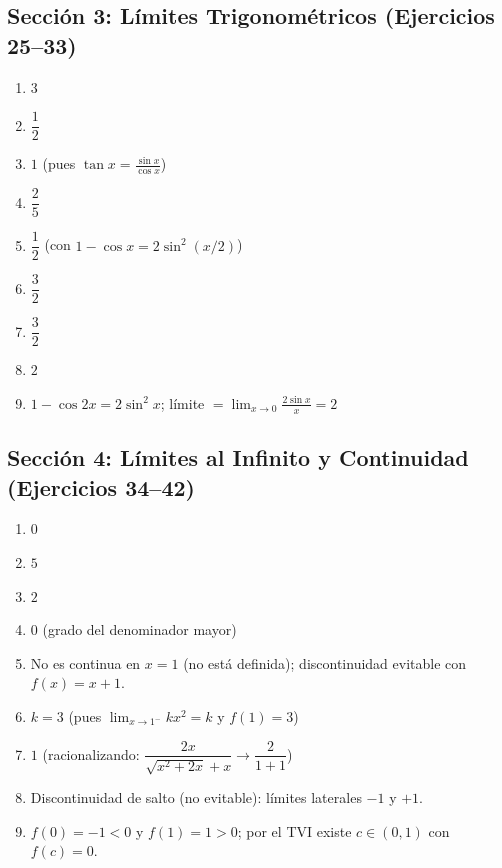 \documentclass[12pt, letterpaper]{article}
\begin{document}
  \subsection*{Sección 3: Límites Trigonométricos (Ejercicios 25--33)}
  \begin{enumerate}[resume=respuestas, leftmargin=*, label=\textbf{\arabic*.}]
    \item $3$
    \item $\dfrac{1}{2}$
    \item $1$ \quad (pues $\tan x = \frac{\sin x}{\cos x}$)
    \item $\dfrac{2}{5}$
    \item $\dfrac{1}{2}$ \quad (con $1 - \cos x = 2\sin^2(x/2)$)
    \item $\dfrac{3}{2}$
    \item $\dfrac{3}{2}$
    \item $2$
    \item $1 - \cos 2x = 2\sin^2 x$; \quad límite $= \displaystyle\lim_{x \to 0} \frac{2\sin x}{x} = 2$
  \end{enumerate}

  \subsection*{Sección 4: Límites al Infinito y Continuidad (Ejercicios 34--42)}
  \begin{enumerate}[resume=respuestas, leftmargin=*, label=\textbf{\arabic*.}]
    \item $0$
    \item $5$
    \item $2$
    \item $0$ (grado del denominador mayor)
    \item No es continua en $x = 1$ (no está definida); discontinuidad evitable con $f(x) = x + 1$.
    \item $k = 3$ \quad (pues $\lim_{x \to 1^-} kx^2 = k$ y $f(1) = 3$)
    \item $1$ \quad (racionalizando: $\dfrac{2x}{\sqrt{x^2 + 2x} + x} \to \dfrac{2}{1 + 1}$)
    \item Discontinuidad de salto (no evitable): límites laterales $-1$ y $+1$.
    \item $f(0) = -1 < 0$ y $f(1) = 1 > 0$; por el TVI existe $c \in (0, 1)$ con $f(c) = 0$.
  \end{enumerate}
\end{document}
